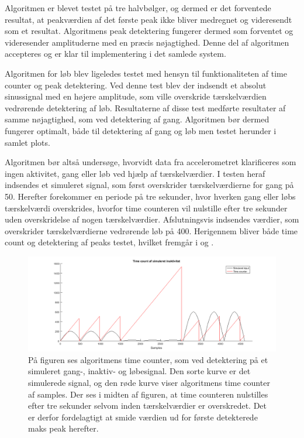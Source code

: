 Algoritmen er blevet testet på tre halvbølger, og dermed er det forventede resultat, at peakværdien af det første peak ikke bliver medregnet og videresendt som et resultat. Algoritmens peak detektering fungerer dermed som forventet og videresender amplituderne med en præcis nøjagtighed. Denne del af algoritmen accepteres og er klar til implementering i det samlede system.

Algoritmen for løb blev ligeledes testet med hensyn til funktionaliteten af time counter og peak detektering. Ved denne test blev der indsendt et absolut sinussignal med en højere amplitude, som ville overskride tærskelværdien vedrørende detektering af løb. Resultaterne af disse test medførte resultater af samme nøjagtighed, som ved detektering af gang. Algoritmen bør dermed fungerer optimalt, både til detektering af gang og løb men testet herunder i samlet plots.

Algoritmen bør altså undersøge, hvorvidt data fra accelerometret klarificeres som ingen aktivitet, gang eller løb ved hjælp af tærskelværdier. I testen heraf indsendes et simuleret signal, som først overskrider tærskelværdierne for gang på 50. Herefter forekommer en periode på tre sekunder, hvor hverken gang eller løbs tærskelværdi overskrides, hvorfor time counteren vil nulstille efter tre sekunder uden overskridelse af nogen tærskelværdier. Afslutningsvis indsendes værdier, som overskrider tærskelværdierne vedrørende løb på 400. Herigennem bliver både time count og detektering af peaks testet, hvilket fremgår i  og . 
\begin{figure}[H]
	\centering
	\includegraphics[scale=0.35]{figures/cDesign/test_timecount_inaktiv.png}
	\caption{På figuren ses algoritmens time counter, som ved detektering på et simuleret gang-, inaktiv- og løbesignal. Den sorte kurve er det simulerede signal, og den røde kurve viser algoritmens time counter af samples. Der ses i midten af figuren, at time counteren nulstilles efter tre sekunder selvom inden tærskelværdier er overskredet. Det er derfor fordelagtigt at smide værdien ud for første detekterede maks peak herefter.}
	\label{fig:test_inaktiv_time}
\end{figure}

